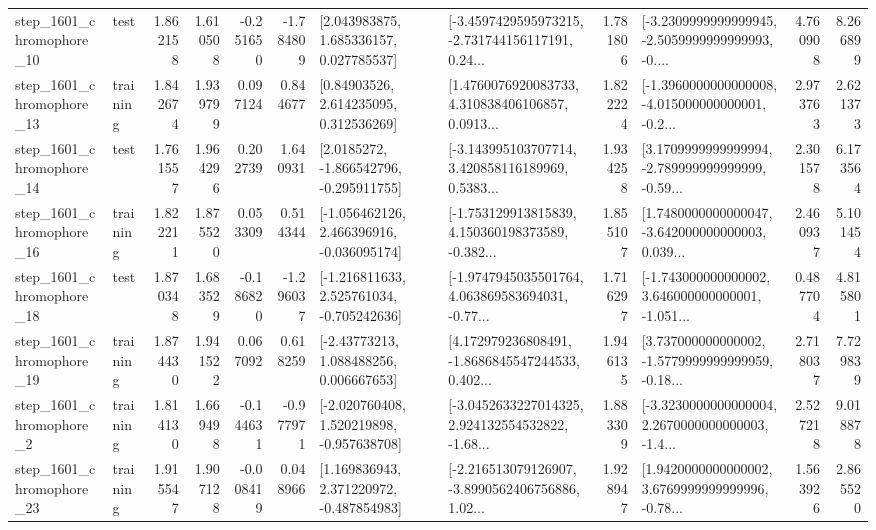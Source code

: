 \begin{tabular}{llrrrrllrlrr}
 step\_1601\_chromophore\_10 &      test &      1.862158 &    1.610508 &     -0.251650 & -1.784809 &     [2.043983875, 1.685336157, 0.027785537] &  [-3.4597429595973215, -2.731744156117191, 0.24... &       1.781806 &  [-3.2309999999999945, -2.5059999999999993, -0.... &            4.760908 &          8.266899 \\
 step\_1601\_chromophore\_13 &  training &      1.842674 &    1.939799 &      0.097124 &  0.844677 &      [0.84903526, 2.614235095, 0.312536269] &  [1.4760076920083733, 4.310838406106857, 0.0913... &       1.822224 &  [-1.3960000000000008, -4.015000000000001, -0.2... &            2.973763 &          2.621373 \\
 step\_1601\_chromophore\_14 &      test &      1.761557 &    1.964296 &      0.202739 &  1.640931 &     [2.0185272, -1.866542796, -0.295911755] &  [-3.143995103707714, 3.420858116189969, 0.5383... &       1.934258 &  [3.1709999999999994, -2.789999999999999, -0.59... &            2.301578 &          6.173564 \\
 step\_1601\_chromophore\_16 &  training &      1.822211 &    1.875520 &      0.053309 &  0.514344 &   [-1.056462126, 2.466396916, -0.036095174] &  [-1.753129913815839, 4.150360198373589, -0.382... &       1.855107 &  [1.7480000000000047, -3.642000000000003, 0.039... &            2.460937 &          5.101454 \\
 step\_1601\_chromophore\_18 &      test &      1.870348 &    1.683529 &     -0.186820 & -1.296037 &   [-1.216811633, 2.525761034, -0.705242636] &  [-1.9747945035501764, 4.063869583694031, -0.77... &       1.716297 &  [-1.743000000000002, 3.646000000000001, -1.051... &            0.487704 &          4.815801 \\
 step\_1601\_chromophore\_19 &  training &      1.874430 &    1.941522 &      0.067092 &  0.618259 &     [-2.43773213, 1.088488256, 0.006667653] &  [4.172979236808491, -1.8686845547244533, 0.402... &       1.946135 &  [3.737000000000002, -1.5779999999999959, -0.18... &            2.718037 &          7.729839 \\
  step\_1601\_chromophore\_2 &  training &      1.814130 &    1.669498 &     -0.144631 & -0.977971 &   [-2.020760408, 1.520219898, -0.957638708] &  [-3.0452633227014325, 2.924132554532822, -1.68... &       1.883309 &  [-3.3230000000000004, 2.2670000000000003, -1.4... &            2.527218 &          9.018878 \\
 step\_1601\_chromophore\_23 &  training &      1.915547 &    1.907128 &     -0.008419 &  0.048966 &    [1.169836943, 2.371220972, -0.487854983] &  [-2.216513079126907, -3.8990562406756886, 1.02... &       1.928947 &  [1.9420000000000002, 3.6769999999999996, -0.78... &            1.563926 &          2.865520 \\

\end{tabular}
